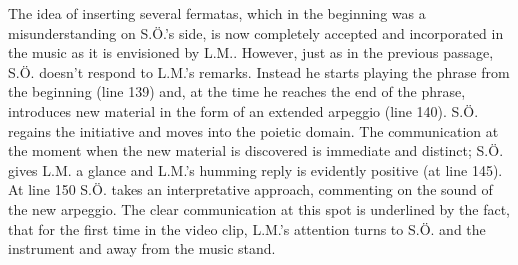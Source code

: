 \documentclass[10pt,letterpaper]{article}
\begin{document}
The idea of inserting several fermatas, which in the beginning was a
misunderstanding on S.{\"O}.'s side, is now completely accepted and
incorporated in the music as it is envisioned by L.M.. However, just as
in the previous passage, S.{\"O}. doesn't respond to L.M.'s
remarks. Instead he starts playing the phrase from the beginning (line
139) and, at the time he reaches the end of the phrase, introduces new
material in the form of an extended arpeggio (line 140). S.{\"O}. regains
the initiative and moves into the poietic domain. The communication at
the moment when the new material is discovered is immediate and
distinct; S.{\"O}. gives L.M. a glance and L.M.'s humming reply is
evidently positive (at line 145). At line 150 S.{\"O}. takes an
interpretative approach, commenting on the sound of the new
arpeggio. The clear communication at this spot is underlined by the
fact, that for the first time in the video clip, L.M.'s attention turns
to S.{\"O}. and the instrument and away from the music stand.
\end{document}
